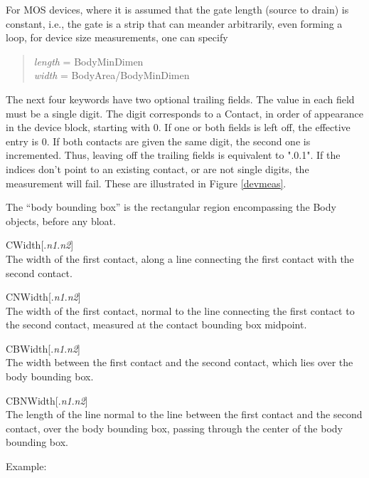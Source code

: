 \begin{description}
\begin{description}
\begin{description}
For MOS devices, where it is assumed that the gate length (source to
drain) is constant, i.e., the gate is a strip that can meander
arbitrarily, even forming a loop, for device size measurements, one
can specify
\begin{quote}
{\it length} = {\et BodyMinDimen}\\
{\it width} = {\et BodyArea}/{\et BodyMinDimen}
\end{quote}
\end{description}

The next four keywords have two optional trailing fields.  The value
in each field must be a single digit.  The digit corresponds to a {\et
Contact}, in order of appearance in the device block, starting with 0. 
If one or both fields is left off, the effective entry is 0.  If both
contacts are given the same digit, the second one is incremented. 
Thus, leaving off the trailing fields is equivalent to ".0.1".  If the
indices don't point to an existing contact, or are not single digits,
the measurement will fail.  These are illustrated in Figure
\ref{devmeas}.

The ``body bounding box'' is the rectangular region encompassing
the {\et Body} objects, before any bloat.

\begin{description}
\item{\et CWidth}[.{\it n1}.{\it n2\/}]\\
The width of the first contact, along a line connecting the first
contact with the second contact.

\item{\et CNWidth}[.{\it n1}.{\it n2\/}]\\
The width of the first contact, normal to the line connecting the
first contact to the second contact, measured at the contact
bounding box midpoint.

\item{\et CBWidth}[.{\it n1}.{\it n2\/}]\\
The width between the first contact and the second contact, which
lies over the body bounding box.

\item{\et CBNWidth}[.{\it n1}.{\it n2\/}]\\
The length of the line normal to the line between the first contact and
the second contact, over the body bounding box, passing through the
center of the body bounding box.
\end{description}

Example:


\end{description}
\end{description}

